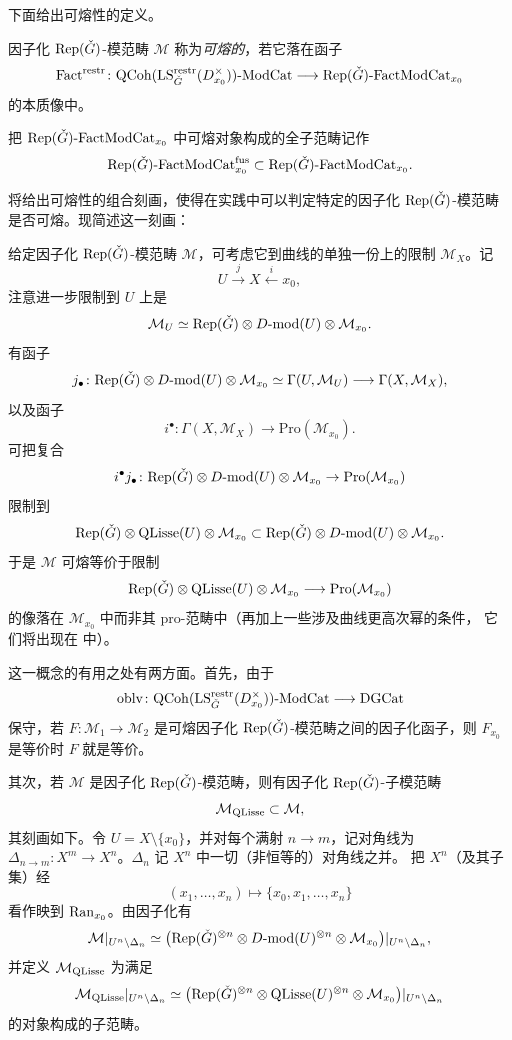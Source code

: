 下面给出可熔性的定义。

\begin{definition}
\label{def:fusable}
因子化 $\mathrm{Rep}(\check G)$-模范畴 $\mathcal{M}$ 称为\emph{可熔的}，若它落在函子
\[
\mathrm{Fact}^{\mathrm{restr}}\colon
\mathrm{QCoh}(\mathrm{LS}^{\mathrm{restr}}_{\check G}(D^\times_{x_0}))\text{-}\mathrm{ModCat}
\longrightarrow \mathrm{Rep}(\check G)\text{-}\mathrm{FactModCat}_{x_0}
\]
的本质像中。
\end{definition}

把 $\mathrm{Rep}(\check G)\text{-}\mathrm{FactModCat}_{x_0}$ 中可熔对象构成的全子范畴记作
\[
\mathrm{Rep}(\check G)\text{-}\mathrm{FactModCat}^{\mathrm{fus}}_{x_0}
\subset \mathrm{Rep}(\check G)\text{-}\mathrm{FactModCat}_{x_0}.
\]

\begin{remark}
\label{rem:fusable-combinatorial}
\cite{BCG26} 将给出可熔性的组合刻画，使得在实践中可以判定特定的因子化
$\mathrm{Rep}(\check G)$-模范畴是否可熔。现简述这一刻画：

给定因子化 $\mathrm{Rep}(\check G)$-模范畴 $\mathcal{M}$，可考虑它到曲线的单独一份上的限制
$\mathcal{M}_X$。记
\[
U\xrightarrow{\ j\ }X\xleftarrow{\ i\ }x_0,
\]
注意进一步限制到 $U$ 上是
\[
\mathcal{M}_U\simeq \mathrm{Rep}(\check G)\otimes D\text{-}\mathrm{mod}(U)\otimes \mathcal{M}_{x_0}.
\]
有函子
\[
j_{\bullet}\colon \mathrm{Rep}(\check G)\otimes D\text{-}\mathrm{mod}(U)\otimes \mathcal{M}_{x_0}
\simeq \Gamma(U,\mathcal{M}_U)\longrightarrow \Gamma(X,\mathcal{M}_X),
\]
以及函子
\[
i^{\bullet}\colon \Gamma(X,\mathcal{M}_X)\longrightarrow \mathrm{Pro}(\mathcal{M}_{x_0}).
\]
可把复合
\[
i^{\bullet}j_{\bullet}\colon
\mathrm{Rep}(\check G)\otimes D\text{-}\mathrm{mod}(U)\otimes \mathcal{M}_{x_0}
\to \mathrm{Pro}(\mathcal{M}_{x_0})
\]
限制到
\[
\mathrm{Rep}(\check G)\otimes \mathrm{QLisse}(U)\otimes \mathcal{M}_{x_0}
\subset \mathrm{Rep}(\check G)\otimes D\text{-}\mathrm{mod}(U)\otimes \mathcal{M}_{x_0}.
\]
于是 $\mathcal{M}$ 可熔等价于限制
\[
\mathrm{Rep}(\check G)\otimes \mathrm{QLisse}(U)\otimes \mathcal{M}_{x_0}
\longrightarrow \mathrm{Pro}(\mathcal{M}_{x_0})
\]
的像落在 $\mathcal{M}_{x_0}$ 中而非其 pro-范畴中（再加上一些涉及曲线更高次幂的条件，
它们将出现在 \cite{BCG26} 中）。

这一概念的有用之处有两方面。首先，由于
\[
\operatorname{oblv}\colon \mathrm{QCoh}(\mathrm{LS}^{\mathrm{restr}}_{\check G}(D^\times_{x_0}))\text{-}\mathrm{ModCat}
\longrightarrow \mathrm{DGCat}
\]
保守，若 $F\colon \mathcal{M}_1\to \mathcal{M}_2$ 是可熔因子化
$\mathrm{Rep}(\check G)$-模范畴之间的因子化函子，则 $F_{x_0}$ 是等价时 $F$ 就是等价。

其次，若 $\mathcal{M}$ 是因子化 $\mathrm{Rep}(\check G)$-模范畴，则有因子化
$\mathrm{Rep}(\check G)$-子模范畴
\[
\mathcal{M}_{\mathrm{QLisse}}\subset \mathcal{M},
\]
其刻画如下。令 $U=X\setminus\{x_0\}$，并对每个满射 $n\to m$，记对角线为
$\Delta_{n\to m}\colon X^m\to X^n$。$\Delta_n$ 记 $X^n$ 中一切（非恒等的）对角线之并。
把 $X^n$（及其子集）经
\[
(x_1,\dots,x_n)\mapsto \{x_0,x_1,\dots,x_n\}
\]
看作映到 $\mathrm{Ran}_{x_0}$。由因子化有
\[
\mathcal{M}|_{U^n\setminus \Delta_n}
\simeq \bigl(\mathrm{Rep}(\check G)^{\otimes n}\otimes D\text{-}\mathrm{mod}(U)^{\otimes n}
\otimes \mathcal{M}_{x_0}\bigr)|_{U^n\setminus \Delta_n},
\]
并定义 $\mathcal{M}_{\mathrm{QLisse}}$ 为满足
\[
\mathcal{M}_{\mathrm{QLisse}}|_{U^n\setminus \Delta_n}
\simeq \bigl(\mathrm{Rep}(\check G)^{\otimes n}\otimes \mathrm{QLisse}(U)^{\otimes n}
\otimes \mathcal{M}_{x_0}\bigr)|_{U^n\setminus \Delta_n}
\]
的对象构成的子范畴。


\end{remark}
